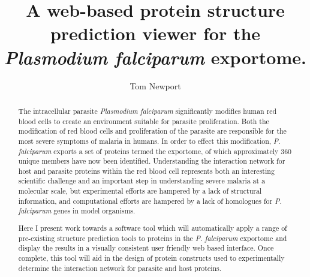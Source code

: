 \documentclass[fleqn,10pt]{article} %
\begin{document}
\title{A web-based protein structure prediction viewer for the \textit{Plasmodium falciparum} exportome.} %

\author{Tom Newport} %
\maketitle


\begin{abstract}

The intracellular parasite \textit{Plasmodium falciparum} significantly modifies human red blood cells to create an environment suitable for parasite proliferation. Both the modification of red blood cells and proliferation of the parasite are responsible for the most severe symptoms of malaria in humans. In order to effect this modification, \textit{P. falciparum} exports a set of proteins termed the exportome, of which approximately 360 unique members have now been identified. Understanding the interaction network for host and parasite proteins within the red blood cell represents both an interesting scientific challenge and an important step in understanding severe malaria at a molecular scale, but experimental efforts are hampered by a lack of structural information, and computational efforts are hampered by a lack of homologues for \textit{P. falciparum} genes in model organisms.

Here I present work towards a software tool which will automatically apply a range of pre-existing structure prediction tools to proteins in the \textit{P. falciparum} exportome and display the results in a visually consistent user friendly web based interface. Once complete, this tool will aid in the design of protein constructs used to experimentally determine the interaction network for parasite and host proteins.

\end{abstract}

\maketitle %

\tableofcontents %

\thispagestyle{empty} %

\newcommand{\bn}
[1]{\textit{#1}}

\newcommand{\pf}
{\bn{P. falciparum }}
\end{document}

